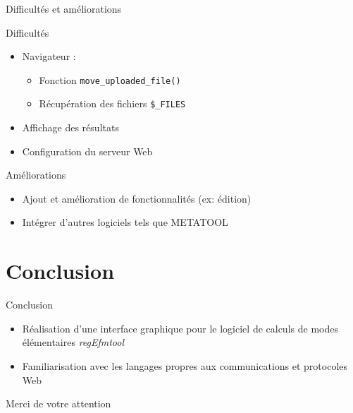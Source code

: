 \documentclass{beamer}
\begin{document}
\begin{frame}{\textcolor{bleu2}{\hspace{1cm}Difficultés et améliorations}}
	\begin{block}{\hspace{0.2cm}Difficultés}
		\begin{itemize}
			\item Navigateur :
			\begin{itemize}
				\item Fonction \texttt{move\_uploaded\_file()}
				\item Récupération des fichiers \texttt{\$\_FILES}
			\end{itemize}
			\item Affichage des résultats
			\item Configuration du serveur Web
		\end{itemize}
	\end{block}
	\begin{block}{\hspace{0.2cm}Améliorations}
		\begin{itemize}
			\item Ajout et amélioration de fonctionnalités (ex: édition)
			\item Intégrer d'autres logiciels tels que METATOOL
		\end{itemize}
	\end{block}
\end{frame}

\section*{Conclusion}

\begin{frame}{\textcolor{bleu2}{\hspace{1cm}Conclusion}}
	\begin{itemize}
	\item Réalisation d'une interface graphique pour le logiciel de calculs de modes élémentaires \emph{regEfmtool}
	\item Familiarisation avec les langages propres aux communications et protocoles Web
	\end{itemize}
\end{frame}

\begin{frame}{}
	\begin{center}
		\textcolor{bleu2}{\hspace{1cm}Merci de votre attention}
	\end{center}
\end{frame}
\end{document}
